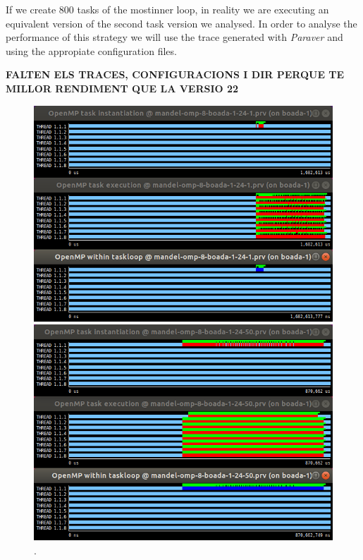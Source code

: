 \documentclass[12pt, a4paper]{article}
\begin{document}
If we create 800 tasks of the mostinner loop, in reality we are executing an equivalent version of the second task version we analysed. In order to analyse the performance of this strategy we will use the trace generated with \textit{Paraver} and using the appropiate configuration files.

\textbf{\large{\large{FALTEN ELS TRACES, CONFIGURACIONS I DIR PERQUE TE MILLOR RENDIMENT QUE LA VERSIO 22}}}



\begin{figure}[H]
\begin{minipage}[t]{0.4\linewidth}
  \centering
  \includegraphics[scale=0.35]{./S2_OMP_tasks_24_1}
  \caption{.}
  \label{fig:S2_OMP_tasks_24_1}
\end{minipage}%
\hspace{1.45cm}
\begin{minipage}[t]{0.4\linewidth}
  \centering
  \includegraphics[scale=0.35]{./S2_OMP_tasks_24_50}
  \caption{.}
  \label{fig:S2_OMP_tasks_24_50}
\end{minipage}
\end{figure}
\end{document}
